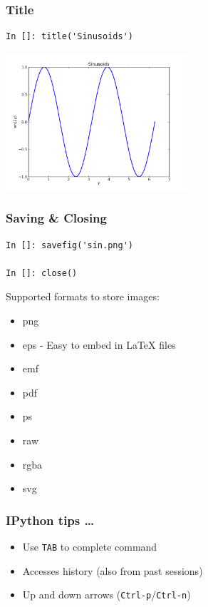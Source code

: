 \documentclass[14pt,compress]{beamer}
\newcommand{\typ}[1]{\lstinline{#1}}
\begin{document}
\begin{frame}[fragile]
\frametitle{Title}
\vspace*{-0.15in}
\begin{lstlisting}
In []: title('Sinusoids')
\end{lstlisting}
  \vspace*{-0.1in}
  \begin{center}
  \includegraphics[height=2in, interpolate=true]{data/title}  
  \end{center}
\end{frame}

\begin{frame}[fragile]
\frametitle{Saving \& Closing}
\begin{lstlisting}
In []: savefig('sin.png')

In []: close()
\end{lstlisting}
Supported formats to store images:
\begin{itemize}
\item png
\item eps - Easy to embed in LaTeX files
\item emf
\item pdf
\item ps
\item raw
\item rgba
\item svg
\end{itemize}
\end{frame}

\begin{frame}[fragile]
\frametitle{IPython tips \ldots}

\begin{itemize}
    \item Use \typ{TAB} to complete command 
\end{itemize}
        \vspace*{0.5in}

        {\Large {}}
\begin{itemize}
    \item Accesses history (also from past sessions)

    \item Up and down arrows (\typ{Ctrl-p}/\typ{Ctrl-n})
\end{itemize}

\end{frame}
\end{document}
